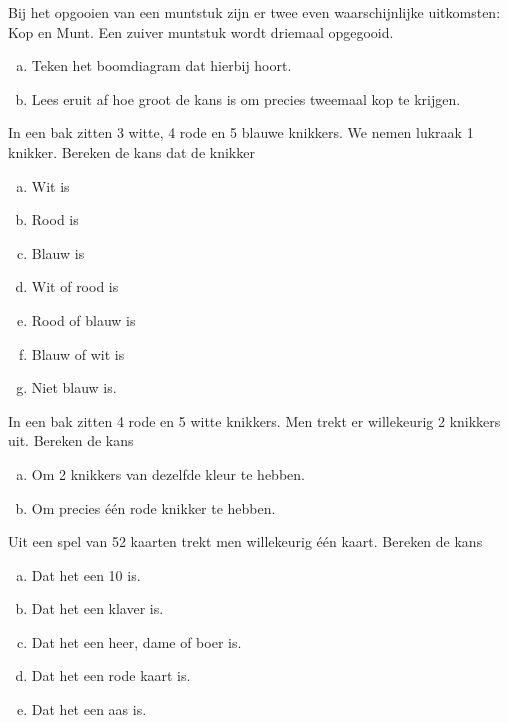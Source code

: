 \documentclass[12pt,twoside]{article}
\begin{document}
\begin{oefening}
Bij het opgooien van een muntstuk zijn er twee even waarschijnlijke uitkomsten: Kop en Munt. Een zuiver muntstuk wordt driemaal opgegooid.
\begin{enumerate}[(a)]
  \item Teken het boomdiagram dat hierbij hoort.
  \item Lees eruit af hoe groot de kans is om precies tweemaal kop te krijgen.
\end{enumerate}
\end{oefening}

\begin{oefening}
In een bak zitten 3 witte, 4 rode en 5 blauwe knikkers. We nemen lukraak 1 knikker. Bereken de kans dat de knikker 
\begin{enumerate}[(a)]
  \item Wit is
  \item Rood is
  \item Blauw is
  \item Wit of rood is
  \item Rood of blauw is
  \item Blauw of wit is
  \item Niet blauw is.
\end{enumerate}
\end{oefening}

\begin{oefening}
In een bak zitten 4 rode en 5 witte knikkers. Men trekt er willekeurig 2 knikkers uit. Bereken de kans
\begin{enumerate}[(a)]
  \item Om 2 knikkers van dezelfde kleur te hebben.
  \item Om precies één rode knikker te hebben.
\end{enumerate}
\end{oefening}

\begin{oefening}
Uit een spel van 52 kaarten trekt men willekeurig één kaart. Bereken de kans
\begin{enumerate}[(a)]
  \item Dat het een 10 is.
  \item Dat het een klaver is.
  \item Dat het een heer, dame of boer is.
  \item Dat het een rode kaart is.
  \item Dat het een aas is.
\end{enumerate}
\end{oefening}
\end{document}
